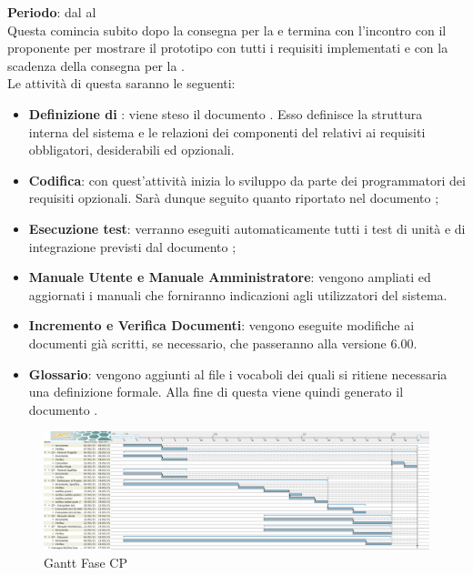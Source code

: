 	\textbf{Periodo}: dal  al  \\Questa {} comincia subito dopo la consegna per la  e termina con l'incontro con il proponente per mostrare il prototipo con tutti i requisiti implementati e con la scadenza della consegna per la . 
	\\Le attività di questa  saranno le seguenti:
	\begin{itemize}
		\item\textbf{Definizione di }: viene steso il documento . Esso definisce la struttura interna del sistema e le relazioni dei componenti del  relativi ai requisiti obbligatori, desiderabili ed opzionali.
		\item \textbf{Codifica}: con quest'attività inizia lo sviluppo da parte dei programmatori dei requisiti opzionali. Sarà dunque seguito quanto riportato nel documento ;
		\item \textbf{Esecuzione test}: verranno eseguiti automaticamente tutti i test di unità e di integrazione previsti dal documento ;
		\item\textbf{Manuale Utente e Manuale Amministratore}: vengono ampliati ed aggiornati i manuali che forniranno indicazioni agli utilizzatori del sistema.
		\item\textbf{Incremento e Verifica Documenti}: vengono eseguite modifiche ai documenti già scritti, se necessario, che passeranno alla versione 6.00.
		\item\textbf{Glossario}: vengono aggiunti al file  i vocaboli dei quali si ritiene necessaria una definizione formale. Alla fine di questa  viene quindi generato il documento .
	\end{itemize}
	\begin{figure}[H]\centering
		\includegraphics[width=\textwidth]{PianoDiProgetto/Pics/FaseCP.png}
	\caption{Gantt Fase CP}
\end{figure}

